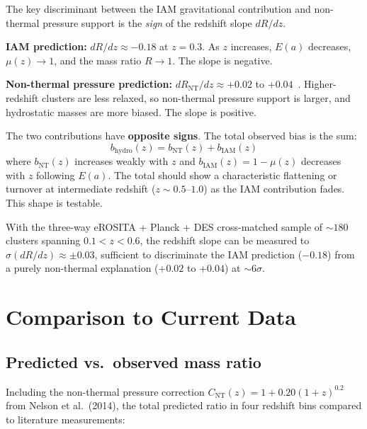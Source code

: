 \documentclass[12pt,a4paper]{article}
\begin{document}
The key discriminant between the IAM gravitational contribution and non-thermal
pressure support is the \emph{sign} of the redshift slope $dR/dz$.

\textbf{IAM prediction:} $dR/dz \approx -0.18$ at $z = 0.3$. As $z$ increases,
$E(a)$ decreases, $\mu(z) \to 1$, and the mass ratio $R \to 1$. The slope is
negative.

\textbf{Non-thermal pressure prediction:} $dR_\mathrm{NT}/dz \approx +0.02$ to
$+0.04$~\citep{Nelson2014,Shi2014}. Higher-redshift clusters are less relaxed,
so non-thermal pressure support is larger, and hydrostatic masses are more biased.
The slope is positive.

The two contributions have \textbf{opposite signs}. The total observed bias is
the sum:
\begin{equation}
b_\mathrm{hydro}(z) = b_\mathrm{NT}(z) + b_\mathrm{IAM}(z)
\end{equation}
where $b_\mathrm{NT}(z)$ increases weakly with $z$ and $b_\mathrm{IAM}(z) =
1 - \mu(z)$ decreases with $z$ following $E(a)$. The total should show a
characteristic flattening or turnover at intermediate redshift ($z \sim 0.5$--$1.0$)
as the IAM contribution fades. This shape is testable.

With the three-way eROSITA + Planck + DES cross-matched sample of $\sim 180$
clusters spanning $0.1 < z < 0.6$, the redshift slope can be measured to
$\sigma(dR/dz) \approx \pm 0.03$, sufficient to discriminate the IAM prediction
($-0.18$) from a purely non-thermal explanation ($+0.02$ to $+0.04$) at
$\sim 6\sigma$.

\section{Comparison to Current Data}

\subsection{Predicted vs.\ observed mass ratio}

Including the non-thermal pressure correction $C_\mathrm{NT}(z) = 1 + 0.20(1+z)^{0.2}$
from Nelson et al.\ (2014), the total predicted ratio in four redshift bins
compared to literature measurements:
\end{document}
